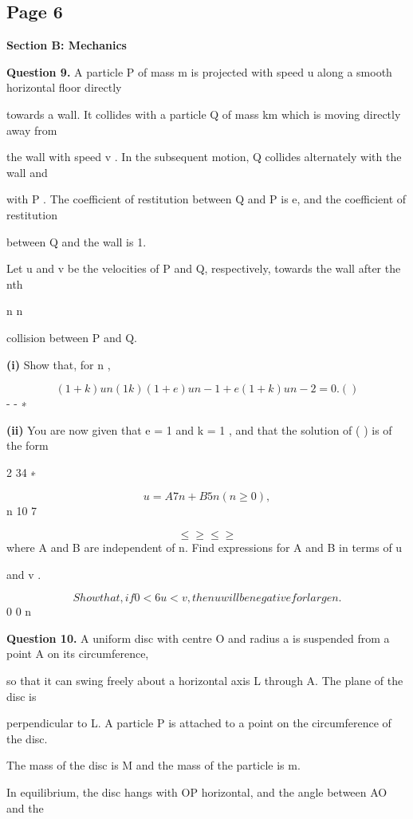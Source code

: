 \documentclass[12pt]{article}
\begin{document}
\subsection*{Page 6}
\begin{flushleft}
\bigskip\textbf{Section B: Mechanics}\par
\bigskip\textbf{Question 9.} A particle P of mass m is projected with speed u along a smooth horizontal floor directly\par
towards a wall. It collides with a particle Q of mass km which is moving directly away from\par
the wall with speed v . In the subsequent motion, Q collides alternately with the wall and\par
with P . The coefficient of restitution between Q and P is e, and the coefficient of restitution\par
between Q and the wall is 1.\par
Let u and v be the velocities of P and Q, respectively, towards the wall after the nth\par
n n\par
collision between P and Q.\par
\textbf{(i)} Show that, for n ,\par
\[(1 + k)u n (1 k)(1 + e)u n-1 + e(1 + k)u n-2 = 0 . ( )\]
- - ∗\par
\textbf{(ii)} You are now given that e = 1 and k = 1 , and that the solution of ( ) is of the form\par
2 34 ∗\par
\[u = A 7 n + B 5 n (n \geq 0) ,\]
n 10 7\par
\[\leq \geq \leq \geq\]
where A and B are independent of n. Find expressions for A and B in terms of u\par
and v .\par
\[Show that, if 0 < 6u < v , then u will be negative for large n.\]
0 0 n\par
\bigskip\textbf{Question 10.} A uniform disc with centre O and radius a is suspended from a point A on its circumference,\par
so that it can swing freely about a horizontal axis L through A. The plane of the disc is\par
perpendicular to L. A particle P is attached to a point on the circumference of the disc.\par
The mass of the disc is M and the mass of the particle is m.\par
In equilibrium, the disc hangs with OP horizontal, and the angle between AO and the\par

\end{flushleft}
\end{document}
